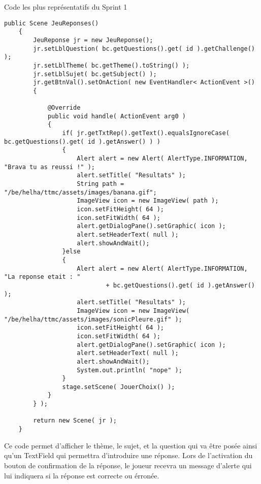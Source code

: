 Code les plus représentatifs du Sprint 1
\begin{lstlisting}
public Scene JeuReponses()
    {
        JeuReponse jr = new JeuReponse();
        jr.setLblQuestion( bc.getQuestions().get( id ).getChallenge() );
        jr.setLblTheme( bc.getTheme().toString() );
        jr.setLblSujet( bc.getSubject() );
        jr.getBtnVal().setOnAction( new EventHandler< ActionEvent >()
        {

            @Override
            public void handle( ActionEvent arg0 )
            {
                if( jr.getTxtRep().getText().equalsIgnoreCase( bc.getQuestions().get( id ).getAnswer() ) )
                {
                    Alert alert = new Alert( AlertType.INFORMATION, "Brava tu as reussi !" );
                    alert.setTitle( "Resultats" );
                    String path = "/be/helha/ttmc/assets/images/banana.gif";
                    ImageView icon = new ImageView( path );
                    icon.setFitHeight( 64 );
                    icon.setFitWidth( 64 );
                    alert.getDialogPane().setGraphic( icon );
                    alert.setHeaderText( null );
                    alert.showAndWait();
                }else
                {
                    Alert alert = new Alert( AlertType.INFORMATION, "La reponse etait : "
                            + bc.getQuestions().get( id ).getAnswer() );
                    alert.setTitle( "Resultats" );
                    ImageView icon = new ImageView( "/be/helha/ttmc/assets/images/sonicPleure.gif" );
                    icon.setFitHeight( 64 );
                    icon.setFitWidth( 64 );
                    alert.getDialogPane().setGraphic( icon );
                    alert.setHeaderText( null );
                    alert.showAndWait();
                    System.out.println( "nope" );
                }
                stage.setScene( JouerChoix() );
            }
        } );

        return new Scene( jr );
    }
\end{lstlisting}

Ce code permet d'afficher le thème, le sujet, et la question qui va être posée ainsi qu'un TextField qui permettra d'introduire une réponse. Lors de l'activation du bouton de confirmation de la réponse, le joueur recevra un message d'alerte qui lui indiquera si la réponse est correcte ou érronée.
